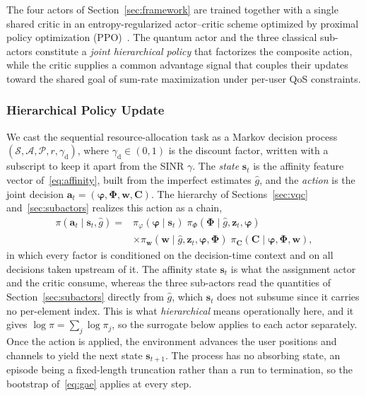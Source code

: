 \documentclass[12pt,onecolumn]{IEEEtran}
\newif\iffull
\begin{document}
\iffull
The four actors of Section~\ref{sec:framework} are trained together with a single shared critic in an entropy-regularized actor--critic scheme optimized by proximal policy optimization (PPO)~\cite{schulman2017proximal}.
The quantum actor and the three classical sub-actors constitute a \emph{joint hierarchical policy} that factorizes the composite action, while the critic supplies a common advantage signal that couples their updates toward the shared goal of sum-rate maximization under per-user QoS constraints.

\subsubsection{Hierarchical Policy Update}

We cast the sequential resource-allocation task as a Markov decision process $(\mathcal{S},\mathcal{A},\mathcal{P},r,\gamma_{\mathrm d})$, where $\gamma_{\mathrm d}\in(0,1)$ is the discount factor, written with a subscript to keep it apart from the SINR $\gamma$. The \emph{state} $\mathbf{s}_t$ is the affinity feature vector of~\eqref{eq:affinity}, built from the imperfect estimates $\hat{g}$, and the \emph{action} is the joint decision $\mathbf{a}_t=(\boldsymbol{\varphi},\boldsymbol{\Phi},\mathbf{w},\mathbf{C})$. The hierarchy of Sections~\ref{sec:vqc} and~\ref{sec:subactors} realizes this action as a chain,
\begin{equation}
\begin{aligned}
    \pi(\mathbf{a}_t \mid \mathbf{s}_t, \hat{g})
    ={}&
    \pi_{\varphi}(\boldsymbol{\varphi} \mid \mathbf{s}_t)\;
    \pi_{\Phi}(\boldsymbol{\Phi} \mid \hat{g}, \mathbf{z}_t, \boldsymbol{\varphi})
    \\[1mm]
    &\times
    \pi_{\mathbf{w}}(\mathbf{w} \mid \hat{g}, \mathbf{z}_t, \boldsymbol{\varphi}, \boldsymbol{\Phi})\;
    \pi_{\mathbf{C}}(\mathbf{C} \mid \boldsymbol{\varphi}, \boldsymbol{\Phi}, \mathbf{w}),
\end{aligned}
    \label{eq:factorization}
\end{equation}
in which every factor is conditioned on the decision-time context and on all decisions taken upstream of it. The affinity state $\mathbf{s}_t$ is what the assignment actor and the critic consume, whereas the three sub-actors read the quantities of Section~\ref{sec:subactors} directly from $\hat{g}$, which $\mathbf{s}_t$ does not subsume since it carries no per-element index. This is what \emph{hierarchical} means operationally here, and it gives $\log\pi=\sum_j\log\pi_j$, so the surrogate below applies to each actor separately. Once the action is applied, the environment advances the user positions and channels to yield the next state $\mathbf{s}_{t+1}$. The process has no absorbing state, an episode being a fixed-length truncation rather than a run to termination, so the bootstrap of~\eqref{eq:gae} applies at every step.
\end{document}
